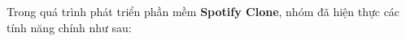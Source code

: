 Trong quá trình phát triển phần mềm \textbf{Spotify Clone}, nhóm đã hiện thực các tính năng chính như sau:










